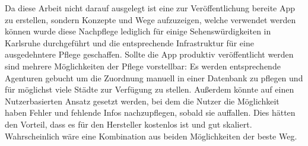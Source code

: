 	\vspace{0.25cm}
	
	Da diese Arbeit nicht darauf ausgelegt ist eine zur Veröffentlichung bereite App zu erstellen, sondern Konzepte und Wege aufzuzeigen, welche verwendet werden können wurde diese Nachpflege lediglich für einige Sehenswürdigkeiten in Karlsruhe durchgeführt und die entsprechende Infrastruktur für eine ausgedehntere Pflege geschaffen. Sollte die App produktiv veröffentlicht werden sind mehrere Möglichkeiten der Pflege vorstellbar: Es werden entsprechende Agenturen gebucht um die Zuordnung manuell in einer Datenbank zu pflegen und für möglichst viele Städte zur Verfügung zu stellen. Außerdem könnte auf einen Nutzerbasierten Ansatz gesetzt werden, bei dem die Nutzer die Möglichkeit haben Fehler und fehlende Infos nachzupflegen, sobald sie auffallen. Dies hätten den Vorteil, dass es für den Hersteller kostenlos ist und gut skaliert. Wahrscheinlich wäre eine Kombination aus beiden Möglichkeiten der beste Weg.
